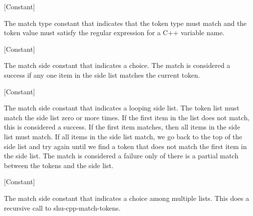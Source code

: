 \vspace{1em}
\noindent
{}
\usebox{\funcname}
 \hfill [Constant]

\begin{doc-string}
The match type constant that indicates that the token type must match and
the token value must satisfy the regular expression for a C++ variable name.
\end{doc-string}

\vspace{1em}
\noindent
{}
\usebox{\funcname}
 \hfill [Constant]

\begin{doc-string}
The match side constant that indicates a choice.  The match is considered a
success if any one item in the side list matches the current token.
\end{doc-string}

\vspace{1em}
\noindent
{}
\usebox{\funcname}
 \hfill [Constant]

\begin{doc-string}
The match side constant that indicates a looping side list.  The token list
must match the side list zero or more times.  If the first item in the list does
not match, this is considered a success.  If the first item matches, then all
items in the side list must match.  If all items in the side list match, we go
back to the top of the side list and try again until we find a token that does
not match the first item in the side list.  The match is considered a failure
only of there is a partial match between the tokens and the side list.
\end{doc-string}

\vspace{1em}
\noindent
{}
\usebox{\funcname}
 \hfill [Constant]

\begin{doc-string}
The match side constant that indicates a choice among multiple lists.
This does a recursive call to shu-cpp-match-tokens.
\end{doc-string}

